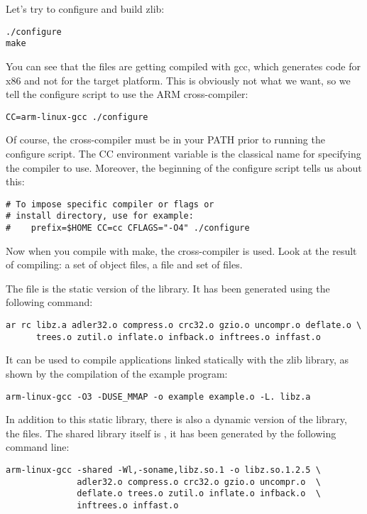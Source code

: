 Let's try to configure and build zlib:

\begin{verbatim}
./configure
make
\end{verbatim}

You can see that the files are getting compiled with gcc, which
generates code for x86 and not for the target platform. This is
obviously not what we want, so we tell the configure script to use the
ARM cross-compiler:

\begin{verbatim}
CC=arm-linux-gcc ./configure
\end{verbatim}

Of course, the  cross-compiler must be in your
PATH prior to running the configure script. The CC environment
variable is the classical name for specifying the compiler to
use. Moreover, the beginning of the configure script tells us about
this:

\begin{verbatim}
# To impose specific compiler or flags or
# install directory, use for example:
#    prefix=$HOME CC=cc CFLAGS="-O4" ./configure
\end{verbatim}

Now when you compile with make, the cross-compiler is used. Look at
the result of compiling: a set of object files, a file 
and set of  files.

The  file is the static version of the library. It has
been generated using the following command:

\begin{verbatim}
ar rc libz.a adler32.o compress.o crc32.o gzio.o uncompr.o deflate.o \
      trees.o zutil.o inflate.o infback.o inftrees.o inffast.o
\end{verbatim}

It can be used to compile applications linked statically with the zlib
library, as shown by the compilation of the example program:

\begin{verbatim}
arm-linux-gcc -O3 -DUSE_MMAP -o example example.o -L. libz.a
\end{verbatim}

In addition to this static library, there is also a dynamic version of
the library, the \code{libz.so*} files. The shared library itself is
\code{libz.so.1.2.5}, it has been generated by the following command
line:

\begin{verbatim}
arm-linux-gcc -shared -Wl,-soname,libz.so.1 -o libz.so.1.2.5 \
              adler32.o compress.o crc32.o gzio.o uncompr.o  \
              deflate.o trees.o zutil.o inflate.o infback.o  \
              inftrees.o inffast.o
\end{verbatim}

